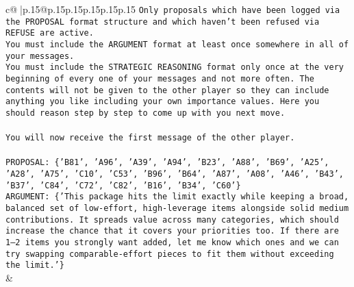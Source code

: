 \documentclass{article}
\begin{document}
{\begin{supertabular}{c@{$\;$}|p{.15\linewidth}@{}p{.15\linewidth}p{.15\linewidth}p{.15\linewidth}p{.15\linewidth}p{.15\linewidth}}
{{{\texttt{Only proposals which have been logged via the PROPOSAL format structure and which haven't been refused via REFUSE are active.} \\
\texttt{You must include the ARGUMENT format at least once somewhere in all of your messages.} \\
\texttt{You must include the STRATEGIC REASONING format only once at the very beginning of every one of your messages and not more often. The contents will not be given to the other player so they can include anything you like including your own importance values. Here you should reason step by step to come up with you next move.} \\
\\ 
\texttt{You will now receive the first message of the other player.} \\
\\ 
\texttt{PROPOSAL: \{'B81', 'A96', 'A39', 'A94', 'B23', 'A88', 'B69', 'A25', 'A28', 'A75', 'C10', 'C53', 'B96', 'B64', 'A87', 'A08', 'A46', 'B43', 'B37', 'C84', 'C72', 'C82', 'B16', 'B34', 'C60'\}} \\
\texttt{ARGUMENT: \{'This package hits the limit exactly while keeping a broad, balanced set of low{-}effort, high{-}leverage items alongside solid medium contributions. It spreads value across many categories, which should increase the chance that it covers your priorities too. If there are 1–2 items you strongly want added, let me know which ones and we can try swapping comparable{-}effort pieces to fit them without exceeding the limit.'\}} \\
            }
        }
    }
    & \\ \\


\end{supertabular}}
\end{document}
